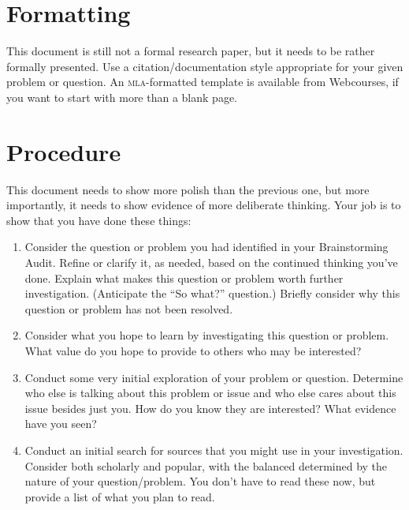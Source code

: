 \documentclass[12pt, twosides]{amsart}	%
\begin{document}
\section{Formatting} %
\label{sec:formatting}
This document is still not a formal research paper, but it needs to be rather formally presented. Use a citation/documentation style appropriate for your given problem or question. An \textsc{mla}-formatted template is available from Webcourses, if you want to start with more than a blank page.

\section{Procedure} %
\label{sec:procedure}
This document needs to show more polish than the previous one, but more importantly, it needs to show evidence of more deliberate thinking. Your job is to show that you have done these things:
\begin{enumerate}
	\item Consider the question or problem you had identified in your Brainstorming Audit. Refine or clarify it, as needed, based on the continued thinking you've done. Explain what makes this question or problem worth further investigation. (Anticipate the ``So what?'' question.) Briefly consider why this question or problem has not been resolved.
	\item Consider what you hope to learn by investigating this question or problem. What value do you hope to provide to others who may be interested? 
	\item Conduct some very initial exploration of your problem or question. Determine who else is talking about this problem or issue and who else cares about this issue besides just you. How do you know they are interested? What evidence have you seen?
	\item Conduct an initial search for sources that you might use in your investigation. Consider both scholarly and popular, with the balanced determined by the nature of your question/problem. You don’t have to read these now, but provide a list of what you plan to read.
\end{enumerate}
\end{document}
